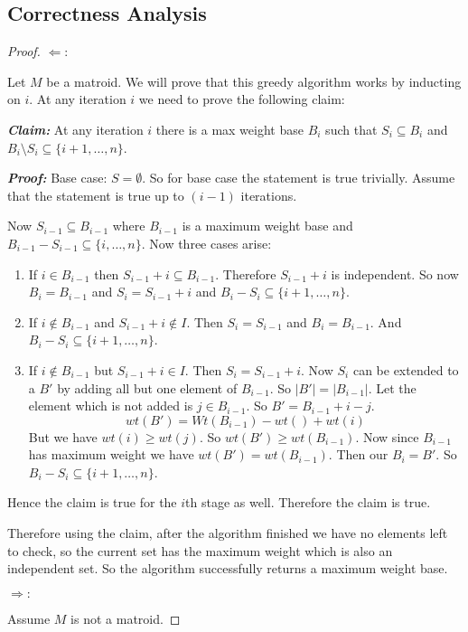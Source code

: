 \documentclass[twoside]{article}
\begin{document}
\subsection{Correctness Analysis}
\begin{proof}
	$\Leftarrow:$\parinf
	
	Let $M$ be a matroid. We will prove that this greedy algorithm works by inducting on $i$. At any iteration $i$ we need to prove the following claim:
	
	\textbf{\textit{Claim:}} At any iteration $i$ there is a max weight base $B_i$ such that $S_i\subseteq B_i$ and $B_i\setminus S_i\subseteq \{i+1,\dots, n\}$.
	
	\textbf{\textit{Proof:}} Base case: $S=\emptyset$. So for base case the statement is true trivially. Assume that the statement is true up to $(i-1)$ iterations.\parinn
	
	Now $S_{i-1}\subseteq B_{i-1}$ where $B_{i-1}$ is a maximum weight base and $B_{i-1}-S_{i-1}\subseteq \{i,\dots, n\}$. Now three cases arise:
	\begin{enumerate}[label=\bfseries Case \arabic*:,leftmargin=1.5cm]
		\item If $i\in B_{i-1}$ then $S_{i-1}+i\subseteq B_{i-1}$. Therefore $S_{i-1}+i$ is independent. So now $B_i=B_{i-1}$ and $S_i=S_{i-1}+i$ and $B_i-S_i\subseteq \{i+1,\dots, n\}$.
		\item If $i\notin B_{i-1}$ and $S_{i-1}+i\notin I$. Then $S_i=S_{i-1}$ and $B_i=B_{i-1}$. And $B_i-S_i\subseteq \{i+1,\dots , n\}$.
		\item If $i\notin B_{i-1}$ but $S_{i-1}+i\in I$. Then $S_i=S_{i-1}+i$. Now $S_i$ can be extended to a $B'$ by adding all but one element of $B_{i-1}$. So $|B'|=|B_{i-1}|$. Let the element which is not added is $j\in B_{i-1}$. So $B'=B_{i-1}+i-j$. $$wt(B')=Wt(B_{i-1})-wt()+wt(i)$$But we have $wt(i)\geq wt(j)$. So $wt(B')\geq wt(B_{i-1})$. Now since $B_{i-1}$ has maximum weight we have $wt(B')=wt(B_{i-1})$. Then our $B_i=B'$. So $B_i-S_i\subseteq \{i+1,\dots, n\}$.
	\end{enumerate}
	Hence the claim is true for the $i$th stage as well. Therefore the claim is true.\Qed
	
	Therefore using the claim, after the algorithm finished we have no elements left to check, so the current set has the maximum weight which is also an independent set. So the algorithm successfully returns a maximum weight base.\parinf
	
	$\Rightarrow:$
	
	Assume $M$ is not a matroid.
	
\end{proof}
\end{document}
